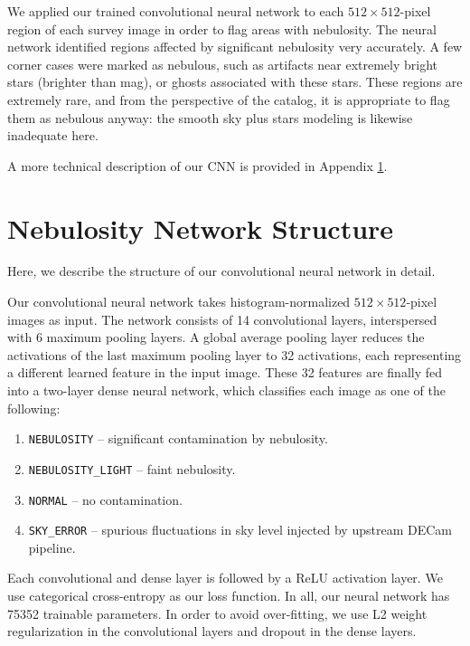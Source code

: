 \documentclass[12pt,twocolumn]{article}
\begin{document}
We applied our trained convolutional neural network to each $512 \times 512$-pixel region of each survey image in order to flag areas with nebulosity. The neural network identified regions affected by significant nebulosity very accurately. A few corner cases were marked as nebulous, such as artifacts near extremely bright stars (brighter than  mag), or ghosts associated with these stars. These regions are extremely rare, and from the perspective of the catalog, it is appropriate to flag them as nebulous anyway: the smooth sky plus stars modeling is likewise inadequate here.

A more technical description of our CNN is provided in Appendix \ref{app:nebulosity-network-structure}.

\appendix

\section{Nebulosity Network Structure}
\label{app:nebulosity-network-structure}

Here, we describe the structure of our convolutional neural network in detail.

Our convolutional neural network takes histogram-normalized $512 \times 512$-pixel images as input. The network consists of 14 convolutional layers, interspersed with 6 maximum pooling layers. A global average pooling layer reduces the activations of the last maximum pooling layer to 32 activations, each representing a different learned feature in the input image. These 32 features are finally fed into a two-layer dense neural network, which classifies each image as one of the following:
\begin{enumerate}
    \itemsep0em
    \item \texttt{NEBULOSITY} -- significant contamination by nebulosity.
    \item \texttt{NEBULOSITY\_LIGHT} -- faint nebulosity.
    \item \texttt{NORMAL} -- no contamination.
    \item \texttt{SKY\_ERROR} -- spurious fluctuations in sky level injected by upstream DECam pipeline.
\end{enumerate}

Each convolutional and dense layer is followed by a ReLU activation layer. We use categorical cross-entropy as our loss function. In all, our neural network has 75352 trainable parameters. In order to avoid over-fitting, we use L2 weight regularization in the convolutional layers and dropout in the dense layers.
\end{document}
